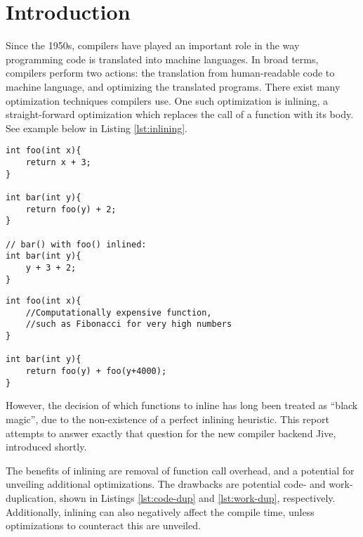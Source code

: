 
\section{Introduction}
\label{introduction}

Since the 1950s, compilers have played an important role in the way programming
code is translated into machine languages. In broad terms, compilers perform two
actions: the translation from human-readable code to machine language, and
optimizing the translated programs. There exist many optimization techniques
compilers use. One such optimization is inlining, a straight-forward
optimization which replaces the call of a function with its body. See example
below in Listing \ref{lst:inlining}.

\begin{center}
	\noindent\begin{minipage}{0.48\textwidth}
		\begin{lstlisting}[label={lst:inlining}, style=customcpp,
caption={Function \textit{foo()} inlined into function \textit{bar()}.}]
int foo(int x){
	return x + 3;
}

int bar(int y){
	return foo(y) + 2;
}

// bar() with foo() inlined:
int bar(int y){
	y + 3 + 2;
}
		\end{lstlisting}
	\end{minipage}
	\noindent\begin{minipage}{0.48\textwidth}
		\begin{lstlisting}[label={lst:work-dup}, style=customcpp,
caption={Work duplication in \textit{bar()}, when inlining \textit{foo()} into
\textit{bar()} due to the calculation of \textit{foo(y)}.}]
int foo(int x){
	//Computationally expensive function,
	//such as Fibonacci for very high numbers
}

int bar(int y){
	return foo(y) + foo(y+4000);
}
		\end{lstlisting}
	\end{minipage}
\end{center}
However, the decision of which functions to inline has long been treated as
``black magic'', due to the non-existence of a perfect inlining heuristic. This
report attempts to answer exactly that question for the new compiler backend
Jive, introduced shortly.

The benefits of inlining are removal of function call overhead, and a potential
for unveiling additional optimizations. The drawbacks are potential code- and
work- duplication, shown in Listings \ref{lst:code-dup} and \ref{lst:work-dup},
respectively. Additionally, inlining can also negatively affect the compile
time, unless optimizations to counteract this are unveiled.

